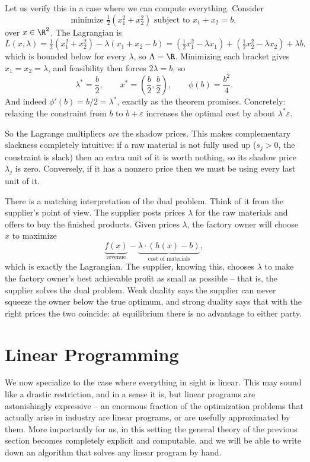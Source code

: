 \documentclass[a4paper]{scrartcl}
\begin{document}
\begin{example}
    Let us verify this in a case where we can compute everything. Consider
    $$
    \text{minimize } \tfrac12(x_1^2 + x_2^2) \text{ subject to } x_1 + x_2 = b,
    $$
    over $x \in \R^2$. The Lagrangian is
    $$
    L(x,\lambda) = \tfrac12(x_1^2 + x_2^2) - \lambda(x_1 + x_2 - b) = \left(\tfrac12x_1^2 - \lambda x_1\right) + \left(\tfrac12 x_2^2 - \lambda x_2\right) + \lambda b,
    $$
    which is bounded below for every $\lambda$, so $\Lambda = \R$. Minimizing each bracket gives $x_1 = x_2 = \lambda$, and feasibility then forces $2\lambda = b$, so
    $$
    \lambda^* = \frac b2, \qquad x^* = \left(\frac b2, \frac b2\right), \qquad \phi(b) = \frac{b^2}{4}.
    $$
    And indeed $\phi'(b) = b/2 = \lambda^*$, exactly as the theorem promises. Concretely: relaxing the constraint from $b$ to $b + \varepsilon$ increases the optimal cost by about $\lambda^*\varepsilon$.
\end{example}

So the Lagrange multipliers \emph{are} the shadow prices. This makes complementary slackness completely intuitive: if a raw material is not fully used up ($s_j > 0$, the constraint is slack) then an extra unit of it is worth nothing, so its shadow price $\lambda_j$ is zero. Conversely, if it has a nonzero price then we must be using every last unit of it.

There is a matching interpretation of the dual problem. Think of it from the supplier's point of view. The supplier posts prices $\lambda$ for the raw materials and offers to buy the finished products. Given prices $\lambda$, the factory owner will choose $x$ to maximize
$$
\underbrace{f(x)}_{\text{revenue}} - \underbrace{\lambda\cdot(h(x) - b)}_{\text{cost of materials}},
$$
which is exactly the Lagrangian. The supplier, knowing this, chooses $\lambda$ to make the factory owner's best achievable profit as small as possible -- that is, the supplier solves the dual problem. Weak duality says the supplier can never squeeze the owner below the true optimum, and strong duality says that with the right prices the two coincide: at equilibrium there is no advantage to either party.

\section{Linear Programming}

We now specialize to the case where everything in sight is linear. This may sound like a drastic restriction, and in a sense it is, but linear programs are astonishingly expressive -- an enormous fraction of the optimization problems that actually arise in industry are linear programs, or are usefully approximated by them. More importantly for us, in this setting the general theory of the previous section becomes completely explicit and computable, and we will be able to write down an algorithm that solves any linear program by hand.
\end{document}
